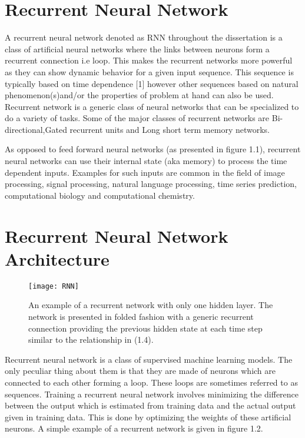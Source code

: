 \newpage
\section{Recurrent Neural Network}

A recurrent neural network denoted as RNN throughout the dissertation is a class of artificial neural networks where the links between neurons form a recurrent connection i.e loop. This makes the recurrent networks more powerful as they can show dynamic behavior for a given input sequence. This sequence is typically based on time dependence [1] however other sequences based on natural phenomenon(s)and/or the properties of problem at hand can also be used. Recurrent network is a generic class of neural networks that can be specialized to do a variety of tasks. Some of the major classes of recurrent networks are Bi-directional,Gated recurrent units and Long short term memory networks.


As opposed to feed forward neural networks (as presented in figure 1.1), recurrent neural networks can use their internal state (aka memory) to process the time dependent inputs. Examples for such inputs are common in the field of image processing, signal processing, natural language processing, time series prediction, computational biology and computational chemistry. 

\section {Recurrent Neural Network Architecture}

\begin{figure}
\centering
\texttt{[image: RNN]}
\caption{An example of a recurrent network with only one hidden layer. The network is presented in folded fashion with a generic recurrent connection providing the previous hidden state at each time step similar to the relationship in (1.4).}
\end{figure}

Recurrent neural network is a class of supervised machine learning models. The only peculiar thing about them is that they are made of neurons which are connected to each other forming a loop. These loops are sometimes referred to as sequences. Training a recurrent neural network involves minimizing the difference between the output which is estimated from training data and the actual output given in training data. This is done by optimizing the weights of these artificial neurons. A simple example of a recurrent network is given in figure 1.2. 


